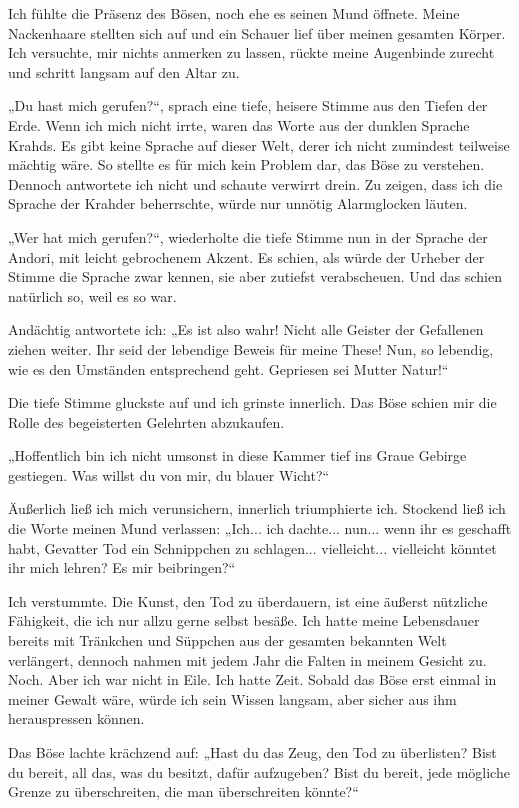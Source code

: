 Ich fühlte die Präsenz des Bösen, noch ehe es seinen Mund öffnete. Meine Nackenhaare stellten sich auf und ein Schauer lief über meinen gesamten Körper. Ich versuchte, mir nichts anmerken zu lassen, rückte meine Augenbinde zurecht und schritt langsam auf den Altar zu.

„Du hast mich gerufen?“, sprach eine tiefe, heisere Stimme aus den Tiefen der Erde. Wenn ich mich nicht irrte, waren das Worte aus der dunklen Sprache Krahds. Es gibt keine Sprache auf dieser Welt, derer ich nicht zumindest teilweise mächtig wäre. So stellte es für mich kein Problem dar, das Böse zu verstehen. Dennoch antwortete ich nicht und schaute verwirrt drein. Zu zeigen, dass ich die Sprache der Krahder beherrschte, würde nur unnötig Alarmglocken läuten.

„Wer hat mich gerufen?“, wiederholte die tiefe Stimme nun in der Sprache der Andori, mit leicht gebrochenem Akzent. Es schien, als würde der Urheber der Stimme die Sprache zwar kennen, sie aber zutiefst verabscheuen. Und das schien natürlich so, weil es so war.

Andächtig antwortete ich: „Es ist also wahr! Nicht alle Geister der Gefallenen ziehen weiter. Ihr seid der lebendige Beweis für meine These! Nun, so lebendig, wie es den Umständen entsprechend geht. Gepriesen sei Mutter Natur!“

Die tiefe Stimme gluckste auf und ich grinste innerlich. Das Böse schien mir die Rolle des begeisterten Gelehrten abzukaufen.

„Hoffentlich bin ich nicht umsonst in diese Kammer tief ins Graue Gebirge gestiegen. Was willst du von mir, du blauer Wicht?“

Äußerlich ließ ich mich verunsichern, innerlich triumphierte ich. Stockend ließ ich die Worte meinen Mund verlassen: „Ich... ich dachte... nun... wenn ihr es geschafft habt, Gevatter Tod ein Schnippchen zu schlagen... vielleicht... vielleicht könntet ihr mich lehren? Es mir beibringen?“

Ich verstummte. Die Kunst, den Tod zu überdauern, ist eine äußerst nützliche Fähigkeit, die ich nur allzu gerne selbst besäße. Ich hatte meine Lebensdauer bereits mit Tränkchen und Süppchen aus der gesamten bekannten Welt verlängert, dennoch nahmen mit jedem Jahr die Falten in meinem Gesicht zu. Noch. Aber ich war nicht in Eile. Ich hatte Zeit. Sobald das Böse erst einmal in meiner Gewalt wäre, würde ich sein Wissen langsam, aber sicher aus ihm herauspressen können.

Das Böse lachte krächzend auf: „Hast du das Zeug, den Tod zu überlisten? Bist du bereit, all das, was du besitzt, dafür aufzugeben? Bist du bereit, jede mögliche Grenze zu überschreiten, die man überschreiten könnte?“

